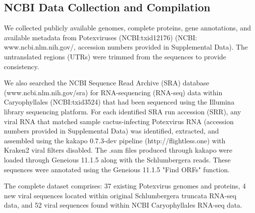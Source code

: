 \documentclass[11pt,letterpaper,titlepage]{article}
\begin{document}
\begin{linenumbers}
\subsection*{NCBI Data Collection and Compilation}
We collected publicly available genomes, complete proteins, gene annotations, and available metadata from Potexviruses (NCBI:txid12176) (NCBI: www.ncbi.nlm.nih.gov/, accession numbers provided in Supplemental Data). 
The untranslated regions (UTRs) were trimmed from the sequences to provide consistency.


We also searched the NCBI Sequence Read Archive (SRA) database (www.ncbi.nlm.nih.gov/sra) for RNA-sequencing (RNA-seq) data within Caryophyllales (NCBI:txid3524) that had been sequenced using the Illumina library sequencing platform. 
For each identified SRA run accession (SRR), any viral RNA that matched sample cactus-infecting Potexvirus RNA (accession numbers provided in Supplemental Data) was identified, extracted, and assembled using the kakapo 0.7.3-dev pipeline (http://flightless.one) with Kraken2 viral filters disabled. 
The .sam files produced through kakapo were loaded through Geneious 11.1.5 along with the Schlumbergera reads.
These sequences were annotated using the Geneious 11.1.5 "Find ORFs" function. 

The complete dataset comprises: 37 existing Potexvirus genomes and proteins, 4 new viral sequences located within original Schlumbergera truncata RNA-seq data, and 52 viral sequences found within NCBI Caryophyllales RNA-seq data.


\end{linenumbers}
\end{document}
